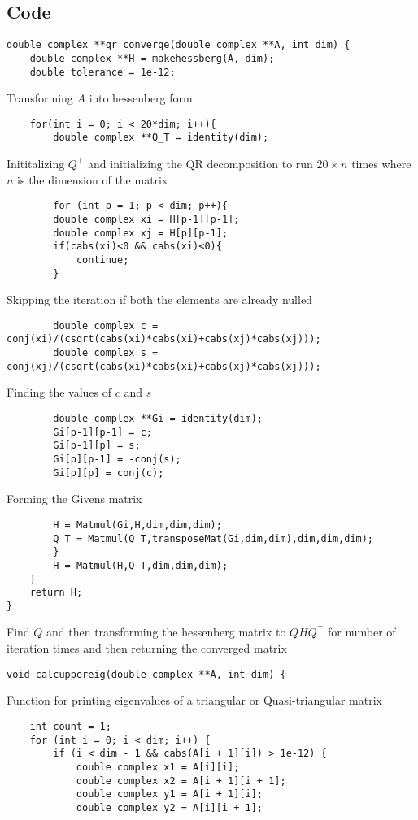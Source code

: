 \documentclass[a4paper,12pt]{article}
\theoremstyle{remark}
\begin{document}
\subsection{Code}
\begin{verbatim}
double complex **qr_converge(double complex **A, int dim) {
    double complex **H = makehessberg(A, dim);
    double tolerance = 1e-12;
\end{verbatim}
Transforming $A$ into hessenberg form
\begin{verbatim}
    for(int i = 0; i < 20*dim; i++){
    	double complex **Q_T = identity(dim);
\end{verbatim}
Inititalizing $Q^\top$ and initializing the QR decomposition to run $20\times n$ times where $n$ is the dimension of the matrix
\begin{verbatim}
    	for (int p = 1; p < dim; p++){
		double complex xi = H[p-1][p-1];
		double complex xj = H[p][p-1];
		if(cabs(xi)<0 && cabs(xi)<0){
			continue;
		}
\end{verbatim}
Skipping the iteration if both the elements are already nulled
\begin{verbatim}
		double complex c = conj(xi)/(csqrt(cabs(xi)*cabs(xi)+cabs(xj)*cabs(xj)));
		double complex s = conj(xj)/(csqrt(cabs(xi)*cabs(xi)+cabs(xj)*cabs(xj)));
\end{verbatim}
Finding the values of $c$ and $s$
\begin{verbatim}
		double complex **Gi = identity(dim);
		Gi[p-1][p-1] = c;
		Gi[p-1][p] = s;
		Gi[p][p-1] = -conj(s);
		Gi[p][p] = conj(c);
\end{verbatim}
Forming the Givens matrix
\begin{verbatim}
		H = Matmul(Gi,H,dim,dim,dim);
		Q_T = Matmul(Q_T,transposeMat(Gi,dim,dim),dim,dim,dim);
    	}
    	H = Matmul(H,Q_T,dim,dim,dim);
    }
    return H;
}
\end{verbatim}
Find $Q$ and then transforming the hessenberg matrix to $QHQ^\top$ for number of iteration times and then returning the converged matrix
\begin{verbatim}
void calcuppereig(double complex **A, int dim) {
\end{verbatim}
Function for printing eigenvalues of a triangular or Quasi-triangular matrix
\begin{verbatim}
    int count = 1;
    for (int i = 0; i < dim; i++) {
        if (i < dim - 1 && cabs(A[i + 1][i]) > 1e-12) {
            double complex x1 = A[i][i];
            double complex x2 = A[i + 1][i + 1];
            double complex y1 = A[i + 1][i];
            double complex y2 = A[i][i + 1];
\end{verbatim}
\end{document}
